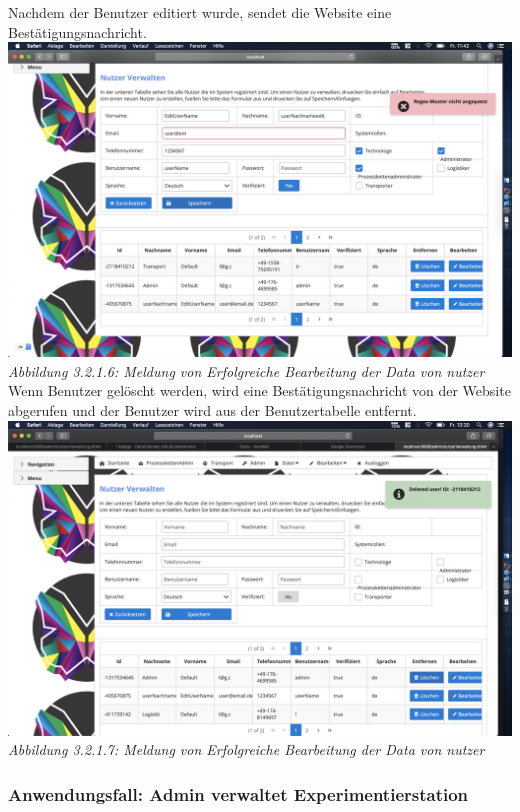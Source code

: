 \documentclass[enabledeprecatedfontcommands,fontsize=12pt,paper=a4,twoside]{scrartcl}
\begin{document}
Nachdem der Benutzer editiert wurde, sendet die Website eine Bestätigungsnachricht.
\hypertarget{sc3.1.2.6}{
\includegraphics[width=1\textwidth]{Screenshots/InconsistenceDataUserBearbeitung.png}
\textit{Abbildung 3.2.1.6: Meldung von Erfolgreiche Bearbeitung der Data von nutzer}
} \\
Wenn Benutzer gelöscht werden, wird eine Bestätigungsnachricht von der Website abgerufen und der Benutzer wird aus der Benutzertabelle entfernt.
\hypertarget{sc3.1.2.7}{
\includegraphics[width=1\textwidth]{Screenshots/BenutzerEntfernen.png}
\textit{Abbildung 3.2.1.7: Meldung von Erfolgreiche Bearbeitung der Data von nutzer}
} \\

\subsubsection{Anwendungsfall: Admin verwaltet Experimentierstation}
\end{document}
